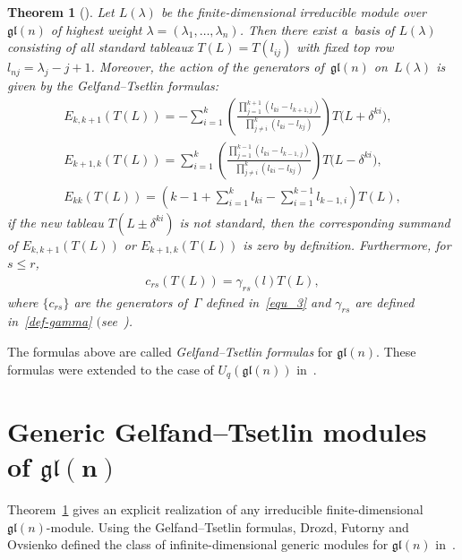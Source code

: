 \documentclass[11pt]{article}
\numberwithin{equation}{section}
\newtheorem{Theorem}{Theorem}[section]
\begin{document}
\begin{Theorem}[\cite{GT}]\label{Gelfand--Tsetlin theorem}
Let $L(\lambda)$ be the finite-dimensional irreducible module over $\mathfrak{gl}(n)$ of highest weight
$\lambda=(\lambda_{1},\ldots,\lambda_{n})$.
Then there exist a~basis of $L(\lambda)$ consisting of all standard tableaux $T(L) = T(l_{ij})$ with fixed top row
$l_{nj}=\lambda_j-j+1$.
Moreover, the action of the generators of~$\mathfrak{gl}(n)$ on~$L(\lambda)$ is given by the Gelfand--Tsetlin
formulas:
\begin{gather}
E_{k,k+1}(T(L)) =-\sum\limits_{i=1}^{k}\left(\frac{\prod\limits_{j=1}^{k+1}(l_{ki}-l_{k+1,j})}{\prod\limits_{j\neq
i}^{k}(l_{ki}-l_{kj})}\right)T\big(L+\delta^{ki}\big),
\nonumber
\\
E_{k+1,k}(T(L)) =\sum\limits_{i=1}^{k}\left(\frac{\prod\limits_{j=1}^{k-1}(l_{ki}-l_{k-1,j})}{\prod\limits_{j\neq
i}^{k}(l_{ki}-l_{kj})}\right)T\big(L-\delta^{ki}\big),
\nonumber
\\
E_{kk}(T(L)) =\left(k-1+\sum\limits_{i=1}^{k}l_{ki}-\sum\limits_{i=1}^{k-1}l_{k-1,i}\right)T(L),
\label{Gelfand--Tsetlin formulas}
\end{gather}
if the new tableau $T(L\pm\delta^{ki})$ is not standard, then the corresponding summand of $E_{k,k+1}(T(L))$ or
$E_{k+1,k}(T(L))$ is zero by definition.
Furthermore, for $s\leq r$,
\begin{gather}
\label{action of Gamma in finite dimensional modules}
c_{rs}(T(L))=\gamma_{rs}(l)T(L),
\end{gather}
where $\{c_{rs}\}$ are the generators of~$\Gamma$ defined in~\eqref{equ_3} and $\gamma_{rs}$ are defined
in~\eqref{def-gamma} $($see~{\rm \cite{Zh})}.
\end{Theorem}
\noindent The formulas above are called \emph{Gelfand--Tsetlin formulas} for $\mathfrak{gl}(n)$.
These formulas were extended to the case of $U_{q}(\mathfrak{gl}(n))$ in~\cite{Tar-Naz}.

\section[Generic Gelfand--Tsetlin modules of $\mathfrak{gl}(n)$]{Generic Gelfand--Tsetlin modules of $\boldsymbol{\mathfrak{gl}(n)}$}
\label{section5}

Theorem~\ref{Gelfand--Tsetlin theorem} gives an explicit realization of any irreducible f\/inite-dimensional
$\mathfrak{gl}(n)$-module.
Using the Gelfand--Tsetlin formulas, Drozd, Futorny and Ovsienko def\/ined the class of inf\/inite-dimensional generic
modules for $\mathfrak{gl}(n)$ in~\cite{DFO3}.
\end{document}
